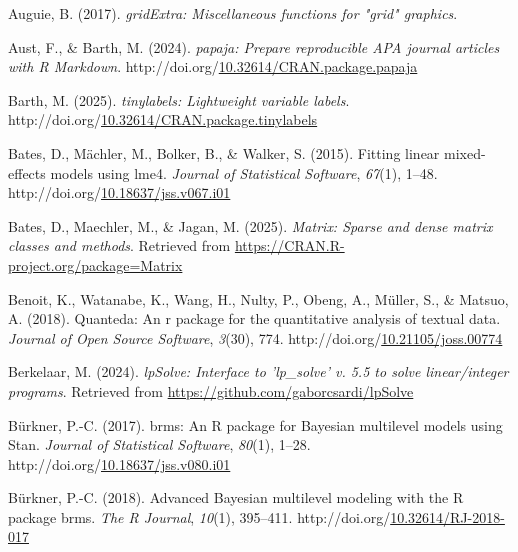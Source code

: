 \documentclass[
  english,
  man,floatsintext]{apa6}
\newlength{\cslhangindent}
\newenvironment{CSLReferences}[2] %
 {\begin{list}{}{%
  \setlength{\itemindent}{0pt}
  \setlength{\leftmargin}{0pt}
  \setlength{\parsep}{0pt}
  \ifodd #1
   \setlength{\leftmargin}{\cslhangindent}
   \setlength{\itemindent}{-1\cslhangindent}
  \fi
  \setlength{\itemsep}{#2\baselineskip}}}
 {\end{list}}
\begin{document}
\protect{}\label{refs}
\begin{CSLReferences}{1}{0}
Auguie, B. (2017). \emph{gridExtra: Miscellaneous functions for "grid" graphics}.

Aust, F., \& Barth, M. (2024). \emph{{papaja}: {Prepare} reproducible {APA} journal articles with {R Markdown}}. http://doi.org/\href{https://doi.org/10.32614/CRAN.package.papaja}{10.32614/CRAN.package.papaja}

Barth, M. (2025). \emph{{tinylabels}: Lightweight variable labels}. http://doi.org/\href{https://doi.org/10.32614/CRAN.package.tinylabels}{10.32614/CRAN.package.tinylabels}

Bates, D., Mächler, M., Bolker, B., \& Walker, S. (2015). Fitting linear mixed-effects models using {lme4}. \emph{Journal of Statistical Software}, \emph{67}(1), 1--48. http://doi.org/\href{https://doi.org/10.18637/jss.v067.i01}{10.18637/jss.v067.i01}

Bates, D., Maechler, M., \& Jagan, M. (2025). \emph{Matrix: Sparse and dense matrix classes and methods}. Retrieved from \url{https://CRAN.R-project.org/package=Matrix}

Benoit, K., Watanabe, K., Wang, H., Nulty, P., Obeng, A., Müller, S., \& Matsuo, A. (2018). Quanteda: An r package for the quantitative analysis of textual data. \emph{Journal of Open Source Software}, \emph{3}(30), 774. http://doi.org/\href{https://doi.org/10.21105/joss.00774}{10.21105/joss.00774}

Berkelaar, M. (2024). \emph{lpSolve: Interface to 'lp\_solve' v. 5.5 to solve linear/integer programs}. Retrieved from \url{https://github.com/gaborcsardi/lpSolve}

Bürkner, P.-C. (2017). {brms}: An {R} package for {Bayesian} multilevel models using {Stan}. \emph{Journal of Statistical Software}, \emph{80}(1), 1--28. http://doi.org/\href{https://doi.org/10.18637/jss.v080.i01}{10.18637/jss.v080.i01}

Bürkner, P.-C. (2018). Advanced {Bayesian} multilevel modeling with the {R} package {brms}. \emph{The R Journal}, \emph{10}(1), 395--411. http://doi.org/\href{https://doi.org/10.32614/RJ-2018-017}{10.32614/RJ-2018-017}


\end{CSLReferences}
\end{document}
